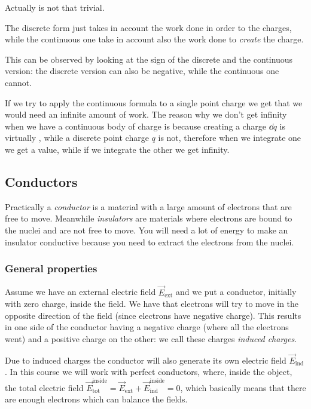 \documentclass[12pt]{extarticle}
\begin{document}
\begin{remark}{}{}
	Actually  is not that trivial.

	The discrete form just takes in account the work done in order to  the charges, while the continuous one take in account also the work done to \emph{create} the charge.

	This can be observed by looking at the sign of the discrete and the continuous version: the discrete version can also be negative, while the continuous one cannot.
\end{remark}

If we try to apply the continuous formula to a single point charge we get that we would need an infinite amount of work.
The reason why we don't get infinity when we have a continuous body of charge is because creating a charge $\dd{q}$ is virtually , while a discrete point charge $q$ is not, therefore when we integrate one we get a value, while if we integrate the other we get infinity.

\subsection{Conductors}

Practically a \emph{conductor} is a material with a large amount of electrons that are free to move.
Meanwhile \emph{insulators} are materials where electrons are bound to the nuclei and are not free to move. You will need a lot of energy to make an insulator conductive because you need to extract the electrons from the nuclei.

\subsubsection{General properties}

Assume we have an external electric field $\vec E_\text{ext}$ and we put a conductor, initially with zero charge, inside the field.
We have that electrons will try to move in the opposite direction of the field (since electrons have negative charge).
This results in one side of the conductor having a negative charge (where all the electrons went) and a positive charge on the other: we call these charges \emph{induced charges}.

Due to induced charges the conductor will also generate its own electric field $\vec E_\text{ind}$.
In this course we will work with perfect conductors, where, inside the object, the total electric field $\vec E_\text{tot}^\text{inside} = \vec E_\text{ext} + \vec E_\text{ind}^\text{inside} = 0$, which basically means that there are enough electrons which can balance the fields.
\end{document}
